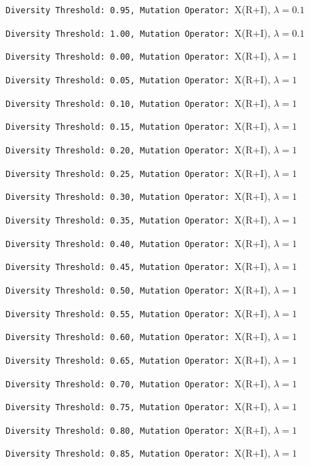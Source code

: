 \documentclass{article}
\begin{document}
\newpage
\verb|Diversity Threshold: 0.95, Mutation Operator: |X(R+I), $\lambda=0.1$

\newpage
\verb|Diversity Threshold: 1.00, Mutation Operator: |X(R+I), $\lambda=0.1$

\newpage
\verb|Diversity Threshold: 0.00, Mutation Operator: |X(R+I), $\lambda=1$

\newpage
\verb|Diversity Threshold: 0.05, Mutation Operator: |X(R+I), $\lambda=1$

\newpage
\verb|Diversity Threshold: 0.10, Mutation Operator: |X(R+I), $\lambda=1$

\newpage
\verb|Diversity Threshold: 0.15, Mutation Operator: |X(R+I), $\lambda=1$

\newpage
\verb|Diversity Threshold: 0.20, Mutation Operator: |X(R+I), $\lambda=1$

\newpage
\verb|Diversity Threshold: 0.25, Mutation Operator: |X(R+I), $\lambda=1$

\newpage
\verb|Diversity Threshold: 0.30, Mutation Operator: |X(R+I), $\lambda=1$

\newpage
\verb|Diversity Threshold: 0.35, Mutation Operator: |X(R+I), $\lambda=1$

\newpage
\verb|Diversity Threshold: 0.40, Mutation Operator: |X(R+I), $\lambda=1$

\newpage
\verb|Diversity Threshold: 0.45, Mutation Operator: |X(R+I), $\lambda=1$

\newpage
\verb|Diversity Threshold: 0.50, Mutation Operator: |X(R+I), $\lambda=1$

\newpage
\verb|Diversity Threshold: 0.55, Mutation Operator: |X(R+I), $\lambda=1$

\newpage
\verb|Diversity Threshold: 0.60, Mutation Operator: |X(R+I), $\lambda=1$

\newpage
\verb|Diversity Threshold: 0.65, Mutation Operator: |X(R+I), $\lambda=1$

\newpage
\verb|Diversity Threshold: 0.70, Mutation Operator: |X(R+I), $\lambda=1$

\newpage
\verb|Diversity Threshold: 0.75, Mutation Operator: |X(R+I), $\lambda=1$

\newpage
\verb|Diversity Threshold: 0.80, Mutation Operator: |X(R+I), $\lambda=1$

\newpage
\verb|Diversity Threshold: 0.85, Mutation Operator: |X(R+I), $\lambda=1$
\end{document}
